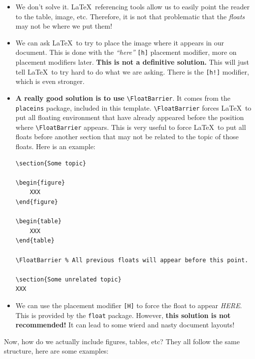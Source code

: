 \begin{itemize}
	\item We don't solve it. \LaTeX\ referencing tools allow us to easily point the reader to the table, image, etc. Therefore, it is not that problematic that the \emph{floats} may not be where we put them!
	\item We can ask \LaTeX\ to try to place the image where it appears in our document. This is done with the \emph{``here''} \verb|[h]| placement modifier, more on placement modifiers later. \textbf{This is not a definitive solution.} This will just tell \LaTeX\ to try hard to do what we are asking. There is the \verb|[h!]| modifier, which is even stronger.
	\item \textbf{A really good solution is to use} \verb|\FloatBarrier|. It comes from the \verb|placeins| package, included in this template. \verb|\FloatBarrier| forces \LaTeX\ to put all floating environment that have already appeared before the position where \verb|\FloatBarrier| appears. This is very useful to force \LaTeX\ to put all floats before another section that may not be related to the topic of those floats. Here is an example:

\begin{lstlisting}[language={[LaTeX]TeX}]
\section{Some topic}

\begin{figure}
	XXX
\end{figure}

\begin{table}
	XXX
\end{table}

\FloatBarrier % All previous floats will appear before this point.

\section{Some unrelated topic}
XXX
\end{lstlisting}
	\item We can use the placement modifier \verb|[H]| to force the float to appear \emph{HERE}. This is provided by the \verb|float| package. However, \textbf{this solution is not recommended!} It can lead to some wierd and nasty document layouts!
\end{itemize}

Now, how do we actually include figures, tables, etc? They all follow the same structure, here are some examples:

